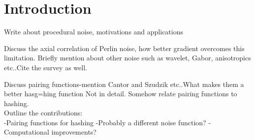 \section{Introduction}

Write about procedural noise, motivations and applications~\cite{ahlvers2005model}

Discuss the axial correlation of Perlin noise, how better gradient overcomes this limitation. Briefly mention about other noise such as wavelet, Gabor, anisotropics etc..Cite the survey as well.

Discuss pairing functions-mention Cantor and Szudzik etc..What makes them a better hasg=hing function Not in detail. Somehow relate pairing functions to hashing.\\

Outline the contributions:\\
-Pairing functions for hashing
-Probably a different noise function?
-Computational improvements?


